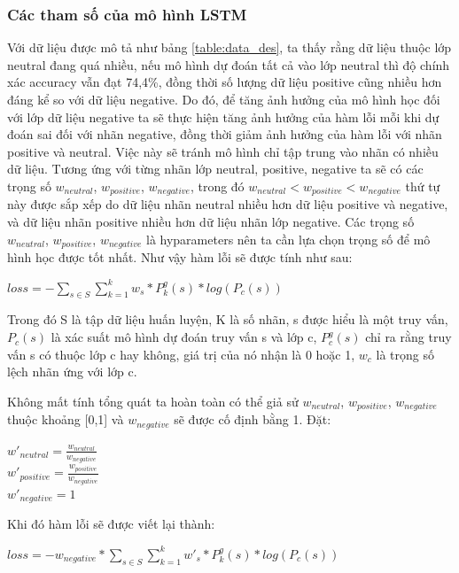 \documentclass[fontsize=12pt]{scrartcl}
\begin{document}
\subsubsection{Các tham số của mô hình LSTM}\label{set_up_lstm}
\par
Với dữ liệu được mô tả như bảng \ref{table:data_des}, ta thấy rằng dữ liệu thuộc lớp neutral đang quá nhiều, nếu mô hình dự đoán tất cả vào lớp neutral thì độ chính xác accuracy vẫn đạt 74,4\%, đồng thời số lượng dữ liệu positive cũng nhiều hơn đáng kể so với dữ liệu negative. Do đó, để tăng ảnh hưởng của mô hình học đối với lớp dữ liệu negative ta sẽ thực hiện tăng ảnh hưởng của hàm lỗi mỗi khi dự đoán sai đối với nhãn negative, đồng thời giảm ảnh hưởng của hàm lỗi với nhãn positive và neutral. Việc này sẽ tránh mô hình chỉ tập trung vào nhãn có nhiều dữ liệu. Tương ứng với từng nhãn lớp neutral, positive, negative ta sẽ có các trọng số $w_{neutral}$, $w_{positive}$, $w_{negative}$, trong đó $w_{neutral} < w_{positive} < w_{negative}$ thứ tự này được sắp xếp do dữ liệu nhãn neutral nhiều hơn dữ liệu positive và negative, và dữ liệu nhãn positive nhiều hơn dữ liệu nhãn lớp negative. Các trọng số  $w_{neutral}$, $w_{positive}$, $w_{negative}$ là hyparameters nên ta cần lựa chọn trọng số để mô hình học được tốt nhất. Như vậy hàm lỗi sẽ được tính như sau:\\
\begin{center}
$loss = - \sum_{s\in S} \sum_{k=1}^k w_s*P_k^g(s)*log(P_c(s))$\\
\end{center}
Trong đó S là tập dữ liệu huấn luyện, K là số nhãn, s được hiểu là một truy vấn, $P_c(s)$ là xác suất mô hình dự đoán truy vấn s và lớp c, $P_c^g(s)$ chỉ ra rằng truy vấn s có thuộc lớp c hay không, giá trị của nó nhận là 0 hoặc 1, $w_c$ là trọng số lệch nhãn ứng với lớp c.
\par
Không mất tính tổng quát ta hoàn toàn có thể giả sử $w_{neutral}$, $w_{positive}$, $w_{negative}$ thuộc khoảng [0,1] và $w_{negative}$ sẽ được cố định bằng 1.
Đặt:\\
\begin{center}
$w'_{neutral} = \frac{w_{neutral}}{w_{negative}}$\\
$w'_{positive} = \frac{w_{positive}}{w_{negative}}$\\
$w'_{negative} = 1$\\
\end{center}
Khi đó hàm lỗi sẽ được viết lại thành:\\
\begin{center}
$loss = - w_{negative}*\sum_{s\in S} \sum_{k=1}^k w'_s*P_k^g(s)*log(P_c(s))$\\
\end{center}
\end{document}
